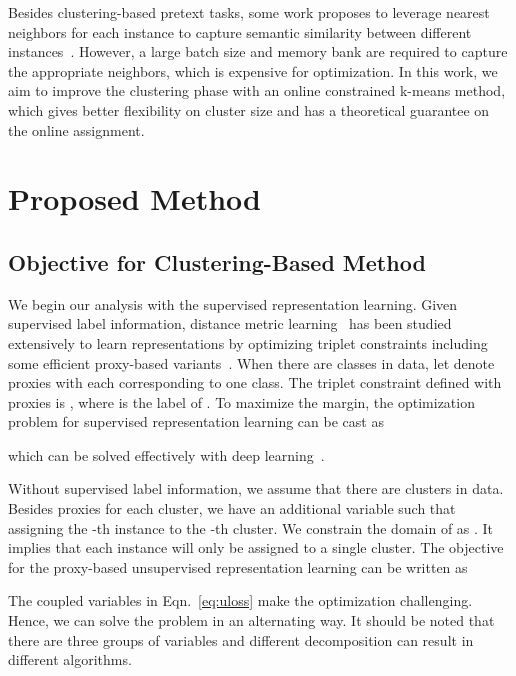 \documentclass[10pt,twocolumn,letterpaper]{article}
\begin{document}
Besides clustering-based pretext tasks, some work proposes to leverage nearest neighbors for each instance to capture semantic similarity between different instances~\cite{abs-2104-14548}. However, a large batch size and memory bank are required to capture the appropriate neighbors, which is expensive for optimization. In this work, we aim to improve the clustering phase with an online constrained k-means method, which gives better flexibility on cluster size and has a theoretical guarantee on the online assignment. 


\section{Proposed Method}\label{sec:method}

\subsection{Objective for Clustering-Based Method}
We begin our analysis with the supervised representation learning. Given supervised label information, distance metric learning~\cite{WeinbergerS09} has been studied extensively to learn representations by optimizing triplet constraints including some efficient proxy-based variants~\cite{Attias17,QianSSHTLJ19,QianTLZJ18}. 
When there are  classes in data, let  denote  proxies with each corresponding to one class. 
The triplet constraint defined with proxies is , where  is the label of . To maximize the margin, the optimization problem for supervised representation learning can be cast as

which can be solved effectively with deep learning~\cite{QianSSHTLJ19}.

Without supervised label information, we assume that there are  clusters in data. Besides proxies for each cluster, we have an additional variable  such that  assigning the -th instance to the -th cluster. We constrain the domain of  as . It implies that each instance will only be assigned to a single cluster. The objective for the proxy-based unsupervised representation learning can be written as
\begin{scriptsize}

\end{scriptsize}
The coupled variables in Eqn.~\ref{eq:uloss} make the optimization challenging. Hence, we can solve the problem in an alternating way. It should be noted that there are three groups of variables  and different decomposition can result in different algorithms.
\end{document}
